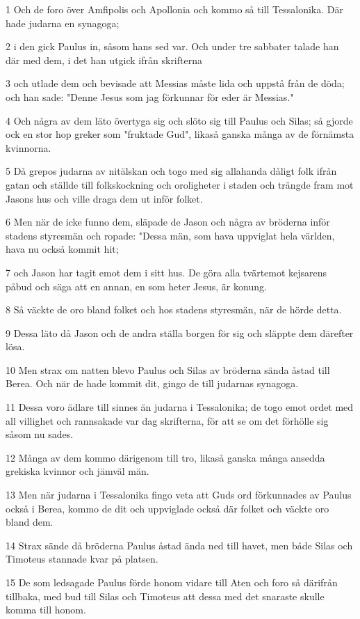 \par 1 Och de foro över Amfipolis och Apollonia och kommo så till Tessalonika. Där hade judarna en synagoga;
\par 2 i den gick Paulus in, såsom hans sed var. Och under tre sabbater talade han där med dem, i det han utgick ifrån skrifterna
\par 3 och utlade dem och bevisade att Messias måste lida och uppstå från de döda; och han sade: "Denne Jesus som jag förkunnar för eder är Messias."
\par 4 Och några av dem läto övertyga sig och slöto sig till Paulus och Silas; så gjorde ock en stor hop greker som "fruktade Gud", likaså ganska många av de förnämsta kvinnorna.
\par 5 Då grepos judarna av nitälskan och togo med sig allahanda dåligt folk ifrån gatan och ställde till folkskockning och oroligheter i staden och trängde fram mot Jasons hus och ville draga dem ut inför folket.
\par 6 Men när de icke funno dem, släpade de Jason och några av bröderna inför stadens styresmän och ropade: "Dessa män, som hava uppviglat hela världen, hava nu också kommit hit;
\par 7 och Jason har tagit emot dem i sitt hus. De göra alla tvärtemot kejsarens påbud och säga att en annan, en som heter Jesus, är konung.
\par 8 Så väckte de oro bland folket och hos stadens styresmän, när de hörde detta.
\par 9 Dessa läto då Jason och de andra ställa borgen för sig och släppte dem därefter lösa.
\par 10 Men strax om natten blevo Paulus och Silas av bröderna sända åstad till Berea. Och när de hade kommit dit, gingo de till judarnas synagoga.
\par 11 Dessa voro ädlare till sinnes än judarna i Tessalonika; de togo emot ordet med all villighet och rannsakade var dag skrifterna, för att se om det förhölle sig såsom nu sades.
\par 12 Många av dem kommo därigenom till tro, likaså ganska många ansedda grekiska kvinnor och jämväl män.
\par 13 Men när judarna i Tessalonika fingo veta att Guds ord förkunnades av Paulus också i Berea, kommo de dit och uppviglade också där folket och väckte oro bland dem.
\par 14 Strax sände då bröderna Paulus åstad ända ned till havet, men både Silas och Timoteus stannade kvar på platsen.
\par 15 De som ledsagade Paulus förde honom vidare till Aten och foro så därifrån tillbaka, med bud till Silas och Timoteus att dessa med det snaraste skulle komma till honom.

